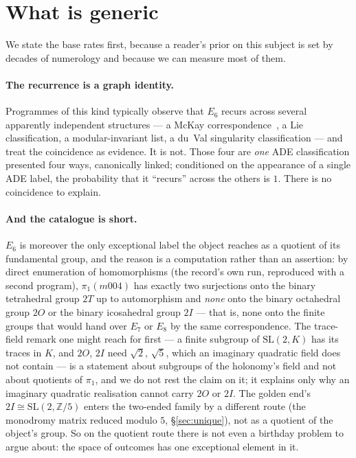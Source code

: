\documentclass[11pt,a4paper]{article}
\theoremstyle{definition}
\theoremstyle{remark}
\newcommand{\Z}{\mathbb{Z}}
\begin{document}
\section{What is generic}\label{sec:generic}

We state the base rates first, because a reader's prior on this subject is set by decades of
numerology and because we can measure most of them.

\paragraph{The recurrence is a graph identity.} Programmes of this kind typically observe that $E_6$
recurs across several apparently independent structures --- a McKay correspondence~\cite{mckay}, a Lie classification, a modular-invariant list, a du~Val singularity classification --- and treat the
coincidence as evidence. It is not. Those four are \emph{one} ADE classification presented four ways,
canonically linked; conditioned on the appearance of a single ADE label, the probability that it
``recurs'' across the others is $1$. There is no coincidence to explain.

\paragraph{And the catalogue is short.} $E_6$ is moreover the only exceptional label the object reaches as a
quotient of its fundamental group, and the reason is a computation rather than an assertion: by direct enumeration
of homomorphisms (the record's own run, reproduced with a second program), $\pi_1(m004)$ has exactly two surjections onto the
binary tetrahedral group $2T$ up to automorphism and \emph{none} onto the binary octahedral group $2O$ or the binary
icosahedral group $2I$ --- that is, none onto the finite groups that would hand over $E_7$ or $E_8$ by the same
correspondence. The trace-field remark one might reach for first --- a finite subgroup of $\mathrm{SL}(2,K)$ has its traces
in $K$, and $2O$, $2I$ need $\sqrt2$, $\sqrt5$, which an imaginary quadratic field does not contain --- is a statement about
subgroups of the holonomy's field and not about quotients of $\pi_1$, and we do not rest the claim on it; it explains only
why an imaginary quadratic realisation cannot carry $2O$ or $2I$. The golden end's $2I \cong \mathrm{SL}(2,\Z/5)$ enters the
two-ended family by a different route (the monodromy matrix reduced modulo $5$, \S\ref{sec:unique}), not as a quotient of the
object's group. So on the quotient route there is not even a birthday problem to argue about: the space of outcomes has one
exceptional element in it.
\end{document}
